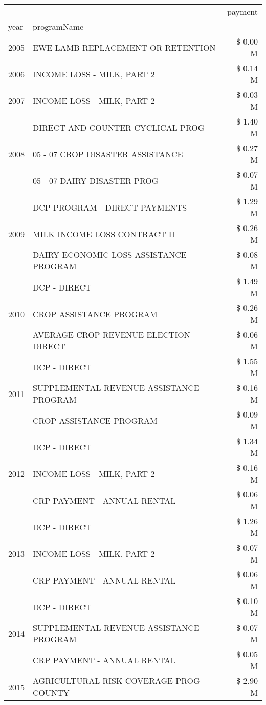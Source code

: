 \begin{tabular}{llr}
\toprule
 &  & payment \\
year & programName &  \\
\midrule
2005 & EWE LAMB REPLACEMENT OR RETENTION & \$ 0.00 M \\
\cline{1-3}
2006 & INCOME LOSS - MILK, PART 2 & \$ 0.14 M \\
\cline{1-3}
2007 & INCOME LOSS - MILK, PART 2 & \$ 0.03 M \\
\cline{1-3}
\multirow[t]{3}{*}{2008} & DIRECT AND COUNTER CYCLICAL PROG & \$ 1.40 M \\
 & 05 - 07 CROP DISASTER ASSISTANCE & \$ 0.27 M \\
 & 05 - 07 DAIRY DISASTER PROG & \$ 0.07 M \\
\cline{1-3}
\multirow[t]{3}{*}{2009} & DCP PROGRAM - DIRECT PAYMENTS & \$ 1.29 M \\
 & MILK INCOME LOSS CONTRACT II & \$ 0.26 M \\
 & DAIRY ECONOMIC LOSS ASSISTANCE PROGRAM & \$ 0.08 M \\
\cline{1-3}
\multirow[t]{3}{*}{2010} & DCP - DIRECT & \$ 1.49 M \\
 & CROP ASSISTANCE PROGRAM & \$ 0.26 M \\
 & AVERAGE CROP REVENUE ELECTION-DIRECT & \$ 0.06 M \\
\cline{1-3}
\multirow[t]{3}{*}{2011} & DCP - DIRECT & \$ 1.55 M \\
 & SUPPLEMENTAL REVENUE ASSISTANCE PROGRAM & \$ 0.16 M \\
 & CROP ASSISTANCE PROGRAM & \$ 0.09 M \\
\cline{1-3}
\multirow[t]{3}{*}{2012} & DCP - DIRECT & \$ 1.34 M \\
 & INCOME LOSS - MILK, PART 2 & \$ 0.16 M \\
 & CRP PAYMENT - ANNUAL RENTAL & \$ 0.06 M \\
\cline{1-3}
\multirow[t]{3}{*}{2013} & DCP - DIRECT & \$ 1.26 M \\
 & INCOME LOSS - MILK, PART 2 & \$ 0.07 M \\
 & CRP PAYMENT - ANNUAL RENTAL & \$ 0.06 M \\
\cline{1-3}
\multirow[t]{3}{*}{2014} & DCP - DIRECT & \$ 0.10 M \\
 & SUPPLEMENTAL REVENUE ASSISTANCE PROGRAM & \$ 0.07 M \\
 & CRP PAYMENT - ANNUAL RENTAL & \$ 0.05 M \\
\cline{1-3}
\multirow[t]{3}{*}{2015} & AGRICULTURAL RISK COVERAGE PROG - COUNTY & \$ 2.90 M \\

\end{tabular}
